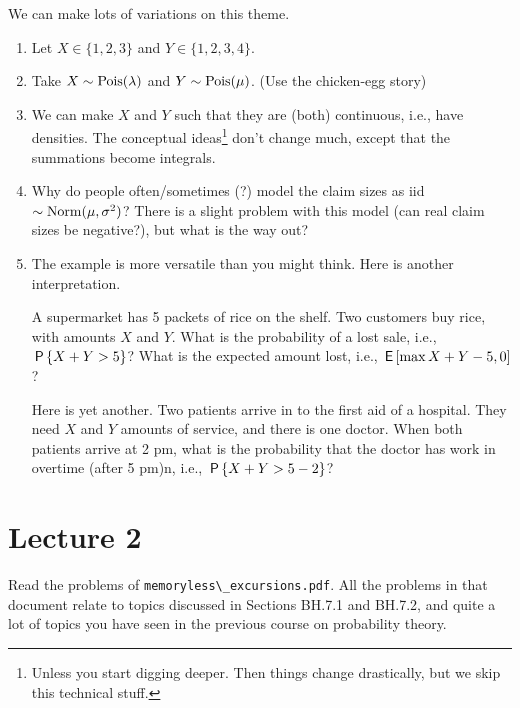 \begin{remark}
We can  make lots of variations on this theme.
\begin{enumerate}
\item Let $X\in \{1,2,3\}$ and $Y\in \{1,2,3,4\}$.
\item Take $X\sim\Pois{\lambda}$ and $Y\sim\Pois{\mu}$. (Use the chicken-egg story)
\item We can make $X$ and $Y$ such that they are (both) continuous, i.e., have densities.
  The conceptual ideas\footnote{Unless you start digging deeper.
    Then things change drastically, but we skip this technical stuff.}
  don't change much, except that the summations become integrals.
\item Why do people often/sometimes (?)
  model the claim sizes as iid $\sim\Norm{\mu, \sigma^{2}}$?
  There is a slight problem with this model (can real claim sizes be negative?), but what is the way out?
\item The example is more versatile than you might think. Here is another interpretation.

A supermarket has 5 packets of rice on the shelf.
Two customers buy rice, with amounts $X$ and $Y$.
What is the probability of a lost sale, i.e., $\P{X+Y>5}$?
What is the expected amount lost, i.e., $\E{ \max{X+Y - 5,0}}$?

Here is yet another.
Two patients arrive in to the first aid of a hospital.
They need $X$ and $Y$ amounts of service, and there is one doctor.
When both patients arrive at 2 pm, what is the probability that the doctor has work in overtime (after 5 pm)n, i.e., $\P{X+Y > 5- 2}$?
\end{enumerate}
\end{remark}


\section{Lecture 2}

Read the problems of \verb|memoryless\_excursions.pdf|.
All the problems in that document relate to topics discussed in Sections BH.7.1 and BH.7.2, and quite a lot of topics you have seen in the previous course on probability theory.






